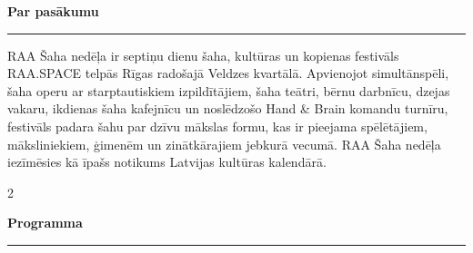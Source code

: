 \documentclass[a4paper,10pt]{article}
\newcommand{\sectionrule}[1]{%
  \vspace{3pt}%
  {\color{raared}\bfseries\large #1}\\[-3pt]%
  {\color{raared}\rule{\linewidth}{0.8pt}}%
  \vspace{2pt}%
}
\begin{document}
\begin{center}
\begin{minipage}{0.90\paperwidth}

\vspace{0.2cm}

\sectionrule{Par pasākumu}

RAA Šaha nedēļa ir septiņu dienu šaha, kultūras un kopienas festivāls RAA.SPACE telpās Rīgas radošajā Veldzes kvartālā. Apvienojot simultānspēli, šaha operu ar starptautiskiem izpildītājiem, šaha teātri, bērnu darbnīcu, dzejas vakaru, ikdienas šaha kafejnīcu un noslēdzošo Hand \& Brain komandu turnīru, festivāls padara šahu par dzīvu mākslas formu, kas ir pieejama spēlētājiem, māksliniekiem, ģimenēm un zinātkārajiem jebkurā vecumā. RAA Šaha nedēļa iezīmēsies kā īpašs notikums Latvijas kultūras kalendārā.

\vspace{0.1cm}

\begin{multicols}{2}

\sectionrule{Programma}


\end{multicols}
\end{minipage}
\end{center}
\end{document}
